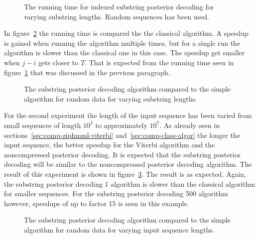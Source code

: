 \begin{figure}
  \centering
  
  \caption{The running time for indexed substring posterior decoding for
    varying substring lengths. Random sequences has been used.}
  \label{fig:assymptotic_indexed_posterior_subseq_length.tex}
\end{figure}

In figure~\ref{fig:indexed_posterior_speedup_vs_subseq} the running time is
compared the the classical algorithm. A speedup is gained when running the
algorithm multiple times, but for a single run the algorithm is slower than the
classical one in this case. The speedup get smaller when $j - i$ gets closer to
$T$. That is expected from the running time seen in
figure~\ref{fig:assymptotic_indexed_posterior_subseq_length.tex} that was
discussed in the previous paragraph.

\begin{figure}
  \centering
  
  \caption{The substring posterior decoding algorithm compared to the simple
    algorithm for random data for varying substring lengths.}
  \label{fig:indexed_posterior_speedup_vs_subseq}
\end{figure}

For the second experiment the length of the input sequence has been varied from
small sequences of length $10^3$ to approximately $10^7$. As already seen in
sections~\ref{sec:comp-ziphmml-viterbi} and~\ref{sec:comp-class-algor} the
longer the input sequence, the better speedup for the Viterbi algorithm and the
noncompressed posterior decoding. It is expected that the substring posterior
decoding will be similar to the noncompressed posterior decoding algorithm. The
result of this experiment is shown in
figure~\ref{fig:indexed_posterior_speedup_vs_T}. The result is as
expected. Again, the substring posterior decoding 1 algorithm is slower than
the classical algorithm for smaller sequences. For the substring posterior
decoding 500 algorithm however, speedups of up to factor 15 is seen in this
example.

\begin{figure}
  \centering
  
  \caption{The substring posterior decoding algorithm compared to the simple
    algorithm for random data for varying input sequence lengths.}
  \label{fig:indexed_posterior_speedup_vs_T}
\end{figure}

